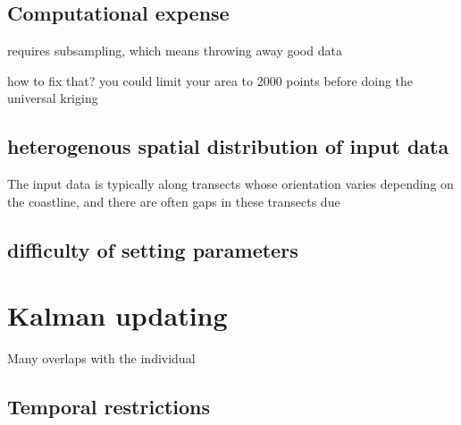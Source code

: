 \subsection{Computational expense}
requires subsampling, which means throwing away good data

how to fix that? you could limit your area to 2000 points before doing the universal kriging 
\subsection{heterogenous spatial distribution of input data}

The input data is typically along transects whose orientation varies depending on the coastline, and there are often gaps in these transects due 
\subsection{difficulty of setting parameters}

\section{Kalman updating}
Many overlaps with the individual 
\subsection{Temporal restrictions}
